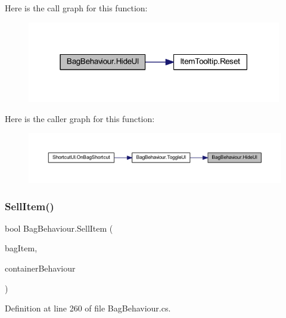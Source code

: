 Here is the call graph for this function\+:
\nopagebreak
\begin{figure}[H]
\begin{center}
\leavevmode
\includegraphics[width=315pt]{class_bag_behaviour_a731b060bd01b971246839664dfd86530_cgraph}
\end{center}
\end{figure}
Here is the caller graph for this function\+:
\nopagebreak
\begin{figure}[H]
\begin{center}
\leavevmode
\includegraphics[width=350pt]{class_bag_behaviour_a731b060bd01b971246839664dfd86530_icgraph}
\end{center}
\end{figure}
\mbox{\label{class_bag_behaviour_aa0aed3d648b13c1add4c2e2ce2ac9c38}} 
\subsubsection{\texorpdfstring{SellItem()}{SellItem()}}
{\footnotesize\ttfamily bool Bag\+Behaviour.\+Sell\+Item (\begin{DoxyParamCaption}\item[{\mbox{\hyperlink{class_bag_item_behaviour}{Bag\+Item\+Behaviour}}}]{bag\+Item,  }\item[{\mbox{\hyperlink{class_container_behaviour}{Container\+Behaviour}}}]{container\+Behaviour }\end{DoxyParamCaption})}



Definition at line 260 of file Bag\+Behaviour.\+cs.

